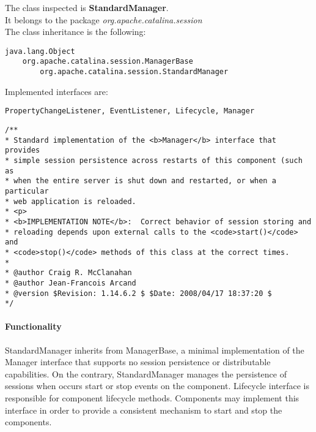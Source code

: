 The class inspected is \textbf{StandardManager}.\\It belongs to the package \textit{org.apache.catalina.session}\\
The class inheritance is the following:
\begin{verbatim}
java.lang.Object
    org.apache.catalina.session.ManagerBase
        org.apache.catalina.session.StandardManager
\end{verbatim}

Implemented interfaces are:
\begin{verbatim}
PropertyChangeListener, EventListener, Lifecycle, Manager
\end{verbatim}

\begin{lstlisting}
/**
* Standard implementation of the <b>Manager</b> interface that provides
* simple session persistence across restarts of this component (such as
* when the entire server is shut down and restarted, or when a particular
* web application is reloaded.
* <p>
* <b>IMPLEMENTATION NOTE</b>:  Correct behavior of session storing and
* reloading depends upon external calls to the <code>start()</code> and
* <code>stop()</code> methods of this class at the correct times.
*
* @author Craig R. McClanahan
* @author Jean-Francois Arcand
* @version $Revision: 1.14.6.2 $ $Date: 2008/04/17 18:37:20 $
*/
\end{lstlisting}
\paragraph{Functionality} StandardManager inherits from ManagerBase, a minimal implementation of the Manager interface that supports no session persistence or distributable capabilities. On the contrary, StandardManager manages the persistence of sessions when occurs start or stop events on the component. Lifecycle interface is responsible for component lifecycle methods. Components may implement this interface in order to provide a consistent mechanism to start and stop the components.


